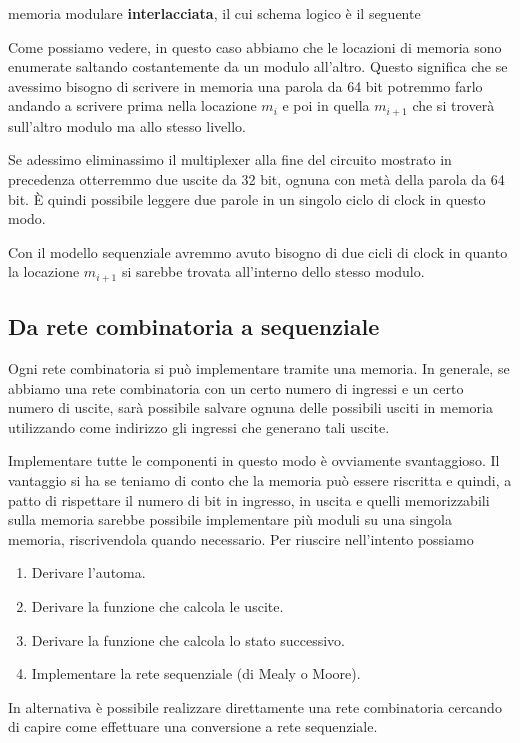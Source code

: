 memoria modulare \textbf{interlacciata}, il cui schema logico è il seguente
\begin{center}
\end{center}
Come possiamo vedere, in questo caso abbiamo che le locazioni di memoria sono enumerate saltando
costantemente da un modulo all'altro. Questo significa che se avessimo bisogno di scrivere in
memoria una parola da 64 bit potremmo farlo andando a scrivere prima nella locazione $m_i$ e poi in
quella $m_{i+1}$ che si troverà sull'altro modulo ma allo stesso livello.

Se adessimo eliminassimo il multiplexer alla fine del circuito mostrato in precedenza otterremmo
due uscite da 32 bit, ognuna con metà della parola da 64 bit. \`E quindi possibile leggere due
parole in un singolo ciclo di clock in questo modo.

Con il modello sequenziale avremmo avuto bisogno di due cicli di clock in quanto la locazione
$m_{i+1}$ si sarebbe trovata all'interno dello stesso modulo.

\subsection{Da rete combinatoria a sequenziale}
Ogni rete combinatoria si può implementare tramite una memoria. In generale, se abbiamo una rete
combinatoria con un certo numero di ingressi e un certo numero di uscite, sarà possibile salvare
ognuna delle possibili usciti in memoria utilizzando come indirizzo gli ingressi che generano tali
uscite.

Implementare tutte le componenti in questo modo è ovviamente svantaggioso. Il vantaggio si ha se
teniamo di conto che la memoria può essere riscritta e quindi, a patto di rispettare il numero di
bit in ingresso, in uscita e quelli memorizzabili sulla memoria sarebbe possibile implementare più
moduli su una singola memoria, riscrivendola quando necessario. Per riuscire nell'intento possiamo
\begin{enumerate}
	\item Derivare l'automa.
	\item Derivare la funzione che calcola le uscite.
	\item Derivare la funzione che calcola lo stato successivo.
	\item Implementare la rete sequenziale (di Mealy o Moore).
\end{enumerate}
In alternativa è possibile realizzare direttamente una rete combinatoria cercando di capire come
effettuare una conversione a rete sequenziale.
